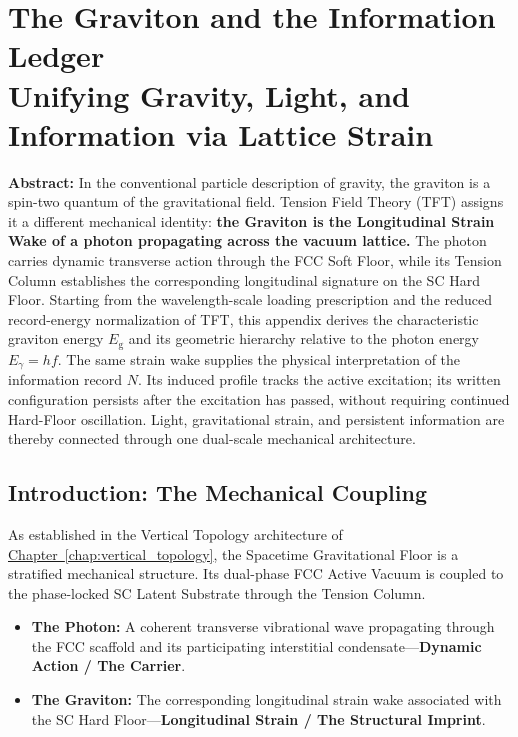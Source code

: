 \chapter[The Graviton and the Information Ledger]{The Graviton and the Information Ledger \\[0.2cm] \large Unifying Gravity, Light, and Information via Lattice Strain}
\label{app:graviton}

\noindent\textbf{Abstract:}
In the conventional particle description of gravity, the graviton is a spin-two quantum of the gravitational field. Tension Field Theory (TFT) assigns it a different mechanical identity: \textbf{the Graviton is the Longitudinal Strain Wake of a photon propagating across the vacuum lattice.} The photon carries dynamic transverse action through the FCC Soft Floor, while its Tension Column establishes the corresponding longitudinal signature on the SC Hard Floor. Starting from the wavelength-scale loading prescription and the reduced record-energy normalization of TFT, this appendix derives the characteristic graviton energy $E_{\mathrm g}$ and its geometric hierarchy relative to the photon energy $E_\gamma=hf$. The same strain wake supplies the physical interpretation of the information record $N$. Its induced profile tracks the active excitation; its written configuration persists after the excitation has passed, without requiring continued Hard-Floor oscillation. Light, gravitational strain, and persistent information are thereby connected through one dual-scale mechanical architecture.

\section{Introduction: The Mechanical Coupling}
\label{sec:AC_mechanical_coupling}

As established in the Vertical Topology architecture of \hyperref[chap:vertical_topology]{Chapter~\ref*{chap:vertical_topology}}, the Spacetime Gravitational Floor is a stratified mechanical structure. Its dual-phase FCC Active Vacuum is coupled to the phase-locked SC Latent Substrate through the Tension Column.

\begin{itemize}
    \item \textbf{The Photon:} A coherent transverse vibrational wave propagating through the FCC scaffold and its participating interstitial condensate---\textbf{Dynamic Action / The Carrier}.
    \item \textbf{The Graviton:} The corresponding longitudinal strain wake associated with the SC Hard Floor---\textbf{Longitudinal Strain / The Structural Imprint}.
\end{itemize}

